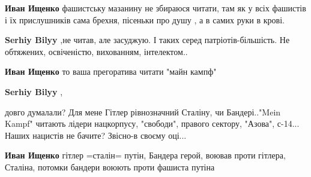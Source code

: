 \begin{itemize}
\begin{itemize}
 
\textbf{Иван Ищенко} фашистську мазанину не збираюся читати, там як у всіх
фашистів і їх прислушників сама брехня, пісеньки про душу , а в самих руки в
крові.

 
\textbf{Serhiy Bilyy} ,не читав, але засуджую. І таких серед патріотів-більшість. Не обтяжених, освіченістю, вихованням, інтелектом..

 
\textbf{Иван Ищенко} то ваша прегоратива читати "майн кампф"

 
\textbf{Serhiy Bilyy} ,

довго думалали? Для мене Гітлер рівнозначний Сталіну, чи
Бандері.."Mein Kampf" читають лідери нацкорпусу, "свободи", правого
сектору, "Азова", с-14... Наших нацистів не бачите? Звісно-в своєму оці...


 
\textbf{Иван Ищенко} гітлер =сталін= путін, Бандера герой, воював проти гітлера, Сталіна, потомки бандери воюють проти фашиста путіна

 

\end{itemize}
\end{itemize}
